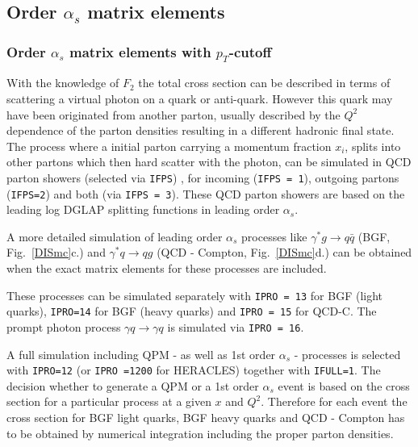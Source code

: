 \documentclass[10pt]{article} \usepackage{dina4}
\begin{document}
\subsection{Order $\alpha_s$ matrix elements}

\subsubsection{Order $\alpha_s$ matrix elements with $p_T$-cutoff}

With the knowledge of $F_2$ the total cross section can be described in 
terms of scattering a virtual photon 
on a quark or anti-quark. However this quark may have
been originated from another parton, usually described by the 
$Q^2$ dependence of the parton densities resulting in a different 
hadronic final state. The process where a initial parton 
carrying a 
momentum fraction $x_i$, splits into other partons which then 
hard scatter with the photon, can be simulated in QCD parton showers 
(selected via \verb+IFPS+) , 
for incoming (\verb+IFPS = 1+), outgoing partons (\verb+IFPS=2+) and both 
(via \verb+IFPS = 3+). These QCD parton showers are based on the 
leading log DGLAP \cite{DGLAPa,DGLAPb,DGLAPc,DGLAPd} splitting functions
in leading order $\alpha_s$. 
\par
A more detailed simulation of 
leading order $\alpha_s$ processes like $\gamma^* g \to q \bar{q}$ 
(BGF, Fig.~\ref{DISmc}c.)
and $\gamma^* q \to q g$ (QCD - Compton, Fig.~\ref{DISmc}d.)
 can be obtained when 
the exact matrix elements for these processes are included.
\par
These 
processes can be simulated separately with \verb+IPRO = 13+ for 
BGF (light quarks), \verb+IPRO=14+ for BGF (heavy quarks)  
and \verb+IPRO = 15+ for QCD-C.
The prompt photon process $\gamma q \to \gamma q$ is simulated via
\verb+IPRO = 16+.
\par
A full simulation including QPM - as well as 1st order $\alpha_s$ - processes
is selected with \verb+IPRO=12+ (or \verb+IPRO =1200+ for
 HERACLES) together 
with \verb+IFULL=1+. The decision whether to generate a QPM or a 1st order 
$\alpha_s$ event is based on the cross section for a particular process 
at a given $x$ and $Q^2$. Therefore for each event the cross section
for BGF light quarks, BGF heavy quarks and QCD - Compton has to be 
obtained by numerical integration including the proper parton densities.
\end{document}
